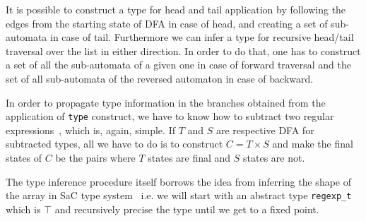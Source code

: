 It is possible to construct a type for head and tail application
by following the edges from the starting state of DFA in case of
head, and creating a set of sub-automata in case of tail.
Furthermore we can infer a type for recursive head/tail traversal
over the list in either direction.  In order to do that, one has
to construct a set of all the sub-automata of a given one in 
case of forward traversal and the set of all sub-automata of
the reversed automaton in case of backward.

In order to propagate type information in the branches obtained from the
application of \verb|type| construct, we have to know how to subtract
two regular expressions~\cite{reglang}, which is, again, simple.  
If $T$ and $S$  are
respective DFA for subtracted types, all we have to do is to construct
$C = T \times S$ and make the final states of $C$ be the pairs where $T$
states are final and $S$ states are not. 

The type inference procedure itself borrows the idea from inferring
the shape of the array in SaC type system~\cite{sac2c} i.e. we will
start with an abstract type \verb|regexp_t|
which is $\top$ and recursively precise the type until we get to
a fixed point.







